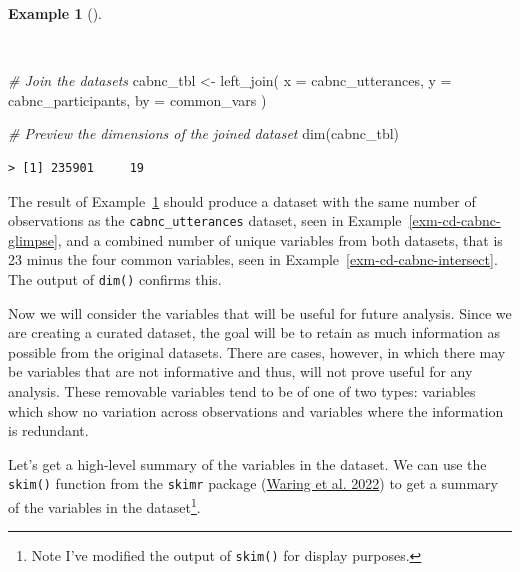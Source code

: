 \documentclass[
  letterpaper,
  DIV=11,
  numbers=noendperiod]{scrreport}
\newenvironment{Shaded}{\begin{snugshade}}{\end{snugshade}}
\newcommand{\AttributeTok}[1]{\textcolor[rgb]{0.00,0.00,0.00}{#1}}
\newcommand{\CommentTok}[1]{\textcolor[rgb]{0.00,0.00,0.00}{\textit{#1}}}
\newcommand{\FunctionTok}[1]{\textcolor[rgb]{0.00,0.00,0.00}{#1}}
\newcommand{\NormalTok}[1]{\textcolor[rgb]{0.00,0.00,0.00}{#1}}
\newcommand{\OtherTok}[1]{\textcolor[rgb]{0.00,0.00,0.00}{#1}}
\theoremstyle{definition}
\newtheorem{example}{Example}[chapter]
\theoremstyle{remark}
\begin{document}
\begin{example}[]\protect\hypertarget{exm-cd-cabnc-join}{}\label{exm-cd-cabnc-join}

~

\begin{Shaded}
\begin{Highlighting}[]
\CommentTok{\# Join the datasets}
\NormalTok{cabnc\_tbl }\OtherTok{\textless{}{-}} 
  \FunctionTok{left\_join}\NormalTok{(}
    \AttributeTok{x =}\NormalTok{ cabnc\_utterances, }
    \AttributeTok{y =}\NormalTok{ cabnc\_participants, }
    \AttributeTok{by =}\NormalTok{ common\_vars}
\NormalTok{  )}

\CommentTok{\# Preview the dimensions of the joined dataset}
\FunctionTok{dim}\NormalTok{(cabnc\_tbl)}
\end{Highlighting}
\end{Shaded}

\begin{verbatim}
> [1] 235901     19
\end{verbatim}

\end{example}

The result of Example~\ref{exm-cd-cabnc-join} should produce a dataset
with the same number of observations as the \texttt{cabnc\_utterances}
dataset, seen in Example~\ref{exm-cd-cabnc-glimpse}, and a combined
number of unique variables from both datasets, that is 23 minus the four
common variables, seen in Example~\ref{exm-cd-cabnc-intersect}. The
output of \texttt{dim()} confirms this.

Now we will consider the variables that will be useful for future
analysis. Since we are creating a curated dataset, the goal will be to
retain as much information as possible from the original datasets. There
are cases, however, in which there may be variables that are not
informative and thus, will not prove useful for any analysis. These
removable variables tend to be of one of two types: variables which show
no variation across observations and variables where the information is
redundant.

Let's get a high-level summary of the variables in the dataset. We can
use the \texttt{skim()} function from the \texttt{skimr} package
(\protect\hyperlink{ref-R-skimr}{Waring et al. 2022}) to get a summary
of the variables in the dataset\footnote{Note I've modified the output
  of \texttt{skim()} for display purposes.}.
\end{document}
